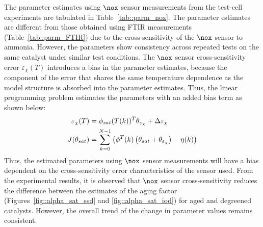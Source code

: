 \par The parameter estimates using $\nox$ sensor measurements from the test-cell experiments are tabulated in
Table~\ref{tab::parm_nox}. The parameter estimates are different from those obtained using FTIR measurements
(Table~\ref{tab::parm_FTIR}) due to the cross-sensitivity of the $\nox$ sensor to ammonia. However, the parameters show
consistency across repeated tests on the same catalyst under similar test conditions. The $\nox$ sensor
cross-sensitivity error $\varepsilon_{\chi}(T)$ introduces a bias in the parameter estimates, because the component of
the error that shares the same temperature dependence as the model structure is absorbed into the parameter estimates.
Thus, the linear programming problem estimates the parameters with an added bias term as shown below:
\begin{align}
        \varepsilon_{\chi}(T) & = \phi_{sat}(T(k))^T \theta_{\varepsilon_{\chi}} + \Delta\varepsilon_{\chi}                    \\
        J(\theta_{sat})
                              & = \sum_{k=0}^{N-1} \left(  \phi^T(k) \left( \theta_{sat} + \theta_{\varepsilon_{\chi}} \right) - \eta (k)  \right)
        \label{eqn::nox_cost}
\end{align}
Thus, the estimated parameters using $\nox$ sensor measurements will have a bias dependent on the cross-sensitivity
error characteristics of the sensor used. From the experimental results, it is observed that $\nox$ sensor
cross-sensitivity reduces the difference between the estimates of the aging factor
(Figures~\ref{fig::alpha_sat_ssd} and \ref{fig::alpha_sat_iod}) for aged and degreened catalysts. However, the overall trend
of the change in parameter values remains consistent.

